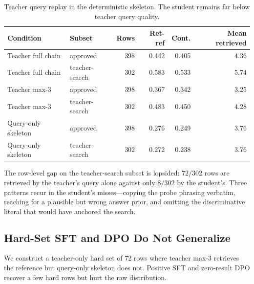 \documentclass[11pt]{article}
\begin{document}
\begin{table}[t]
\centering
\small
\begin{tabular}{llrrrr}
\toprule
\textbf{Condition} & \textbf{Subset} & \textbf{Rows} & \textbf{Ret-ref} & \textbf{Cont.} & \textbf{Mean retrieved} \\
\midrule
Teacher full chain & approved & 398 & 0.442 & 0.405 & 4.36 \\
Teacher full chain & teacher-search & 302 & 0.583 & 0.533 & 5.74 \\
Teacher max-3 & approved & 398 & 0.367 & 0.342 & 3.25 \\
Teacher max-3 & teacher-search & 302 & 0.483 & 0.450 & 4.28 \\
Query-only skeleton & approved & 398 & 0.276 & 0.249 & 3.76 \\
Query-only skeleton & teacher-search & 302 & 0.272 & 0.238 & 3.76 \\
\bottomrule
\end{tabular}
\caption{Teacher query replay in the deterministic skeleton. The student remains far below teacher query quality.}
\label{tab:teacherquery}
\end{table}

The row-level gap on the teacher-search subset is lopsided: $72/302$ rows are retrieved by the teacher's query alone against only $8/302$ by the student's. Three patterns recur in the student's misses---copying the probe phrasing verbatim, reaching for a plausible but wrong answer prior, and omitting the discriminative literal that would have anchored the search.

\subsection{Hard-Set SFT and DPO Do Not Generalize}

We construct a teacher-only hard set of 72 rows where teacher max-3 retrieves the reference but query-only skeleton does not. Positive SFT and zero-result DPO recover a few hard rows but hurt the raw distribution.

\begin{table}[t]
\centering
\small
{}
\caption{Small hard-set SFT/DPO recovers some hard rows but does not generalize.}
\label{tab:hard}
\end{table}
\end{document}
